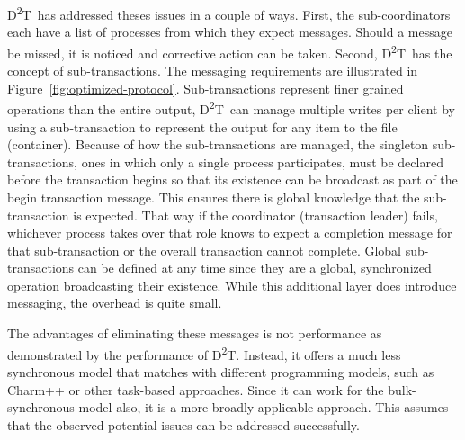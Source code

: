 \documentclass[conference]{IEEEtran}
\newcommand{\DDT}{D\textsuperscript{2}T~}
\newcommand{\DDTns}{D\textsuperscript{2}T}
\begin{document}
\DDT has addressed theses issues in a couple of ways. First, the
sub-coordinators each have a list of processes from which they expect messages.
Should a message be missed, it is noticed and corrective action can be taken.
Second, \DDT has the concept of sub-transactions. The messaging requirements
are illustrated in Figure~\ref{fig:optimized-protocol}.  Sub-transactions
represent finer grained operations than the entire output, \DDT can manage
multiple writes per client by using a sub-transaction to represent the output
for any item to the file (container). Because of how the sub-transactions are
managed, the singleton sub-transactions, ones in which only a single process
participates, must be declared before the transaction begins so that its
existence can be broadcast as part of the begin transaction message. This
ensures there is global knowledge that the sub-transaction is expected.  That
way if the coordinator (transaction leader) fails, whichever process takes over
that role knows to expect a completion message for that sub-transaction or the
overall transaction cannot complete. Global sub-transactions can be defined at
any time since they are a global, synchronized operation broadcasting their
existence. While this additional layer does introduce messaging, the overhead
is quite small.

The advantages of eliminating these messages is not performance as demonstrated
by the performance of \DDTns. Instead, it offers a much less synchronous model
that matches with different programming models, such as Charm++ or other
task-based approaches. Since it can work for the bulk-synchronous model also,
it is a more broadly applicable approach. This assumes that the observed
potential issues can be addressed successfully.
\end{document}
